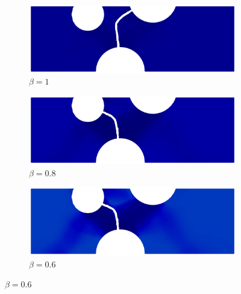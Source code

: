 \begin{figure}[!htb]
  \centering
  \begin{subfigure}[b]{0.3\textwidth}
    \centering
    \includegraphics[width=\textwidth,scale=0.5]{Chapter5/figures/3pb/beta_1}
    \caption{$\beta=1$}
  \end{subfigure}
  \begin{subfigure}[b]{0.3\textwidth}
    \centering
    \includegraphics[width=\textwidth,scale=0.5]{Chapter5/figures/3pb/beta_0.8}
    \caption{$\beta=0.8$}
  \end{subfigure}
  \begin{subfigure}[b]{0.3\textwidth}
    \centering
    \includegraphics[width=\textwidth,scale=0.5]{Chapter5/figures/3pb/beta_0.6}
    \caption{$\beta=0.6$}
  \end{subfigure}
  

\end{figure}
